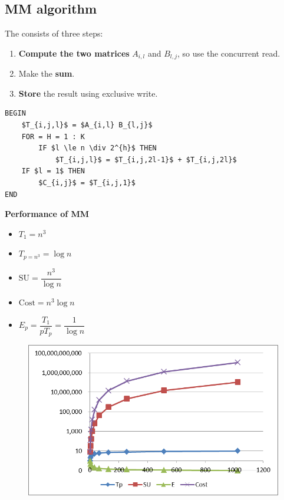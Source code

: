 \subsection{MM algorithm}

The  consists of three steps:
\begin{enumerate}
    \item \textbf{Compute the two matrices} $A_{i,l}$ and $B_{l,j}$, so use the concurrent read.
    \item Make the \textbf{sum}.
    \item \textbf{Store} the result using exclusive write.
\end{enumerate}
\begin{lstlisting}[mathescape=true, caption={Matrix Multiply (MM)}]
BEGIN
    $T_{i,j,l}$ = $A_{i,l} B_{l,j}$
    FOR = H = 1 : K
        IF $l \le n \div 2^{h}$ THEN
            $T_{i,j,l}$ = $T_{i,j,2l-1}$ + $T_{i,j,2l}$
    IF $l = 1$ THEN
        $C_{i,j}$ = $T_{i,j,1}$
END
\end{lstlisting}
\begin{flushleft}
    \textcolor{Green3}{ \textbf{Performance of MM}}
\end{flushleft}
\begin{itemize}
    \item $T_{1} = n^{3}$
    \item $T_{p = n^{3}} = \log n$
    \item $\mathrm{SU} = \dfrac{n^{3}}{\log n}$
    \item $\text{Cost} = n^{3} \log n$
    \item $E_{p} = \dfrac{T_{1}}{pT_{p}} = \dfrac{1}{\log n}$
\end{itemize}
\begin{figure}[!htp]
    \centering
    \includegraphics[width=.6\textwidth]{img/mm-1.png}
\end{figure}